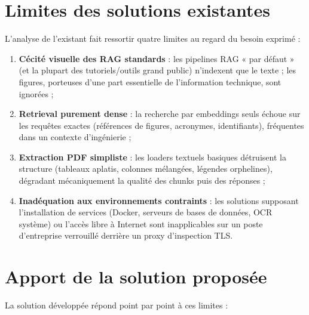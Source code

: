 \section{Limites des solutions existantes}
\label{sec:limites-existant}

L'analyse de l'existant fait ressortir quatre limites au regard du besoin exprimé :

\begin{enumerate}
  \item \textbf{Cécité visuelle des RAG standards} : les pipelines RAG « par défaut »
        (et la plupart des tutoriels/outils grand public) n'indexent que le texte ; les
        figures, porteuses d'une part essentielle de l'information technique, sont ignorées ;
  \item \textbf{Retrieval purement dense} : la recherche par embeddings seuls échoue sur
        les requêtes exactes (références de figures, acronymes, identifiants), fréquentes
        dans un contexte d'ingénierie ;
  \item \textbf{Extraction PDF simpliste} : les loaders textuels basiques détruisent la
        structure (tableaux aplatis, colonnes mélangées, légendes orphelines), dégradant
        mécaniquement la qualité des chunks puis des réponses ;
  \item \textbf{Inadéquation aux environnements contraints} : les solutions supposant
        l'installation de services (Docker, serveurs de bases de données, OCR système) ou
        l'accès libre à Internet sont inapplicables sur un poste d'entreprise verrouillé
        derrière un proxy d'inspection TLS.
\end{enumerate}

\section{Apport de la solution proposée}
\label{sec:apport}

La solution développée répond point par point à ces limites :

